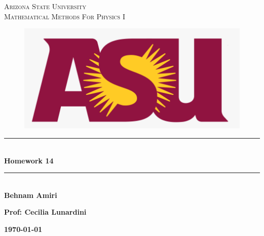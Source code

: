 \documentclass[fleqn]{article}
\begin{document}
  \begin{titlepage}

    \newcommand{\HRule}{\rule{\linewidth}{0.5mm}} %

    \center %

    \textsc{\LARGE Arizona State University}\\[1.5cm] %

    \textsc{\LARGE Mathematical Methods For Physics I }\\[1.5cm] %


    \begin{figure}
      \includegraphics[width=\linewidth]{asu.png}
    \end{figure}


    \HRule \\[0.4cm]
    { \huge \bfseries Homework 14}\\[0.4cm] 
    \HRule \\[1.5cm]

    \textbf{Behnam Amiri}

    \bigbreak

    \textbf{Prof: Cecilia Lunardini}

    \bigbreak


    \textbf{{\large \today}\\[2cm]}

    \vfill %

  \end{titlepage}
\end{document}
